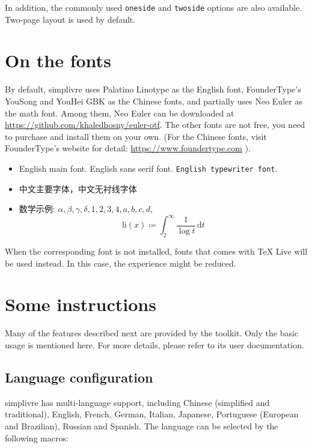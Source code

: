 \documentclass[puretext]{simplivre}
\newenvironment{tip}[1][Tip]{%
    \LocallyStopLineNumbers%
    \begin{tcolorbox}[breakable,
        enhanced,
        width = \textwidth,
        colback = paper, colbacktitle = paper,
        colframe = gray!50, boxrule=0.2mm,
        coltitle = black,
        fonttitle = \sffamily,
        attach boxed title to top left = {yshift=-\tcboxedtitleheight/2, xshift=.5cm},
        boxed title style = {boxrule=0pt, colframe=paper},
        before skip = 0.3cm,
        after skip = 0.3cm,
        top = 3mm,
        bottom = 3mm,
        title={\scshape\sffamily #1}]%
}{\end{tcolorbox}\ResumeLineNumbers}
\providecommand{\simplivre}{\textsf{simplivre}}
\begin{document}
\bigskip
In addition, the commonly used \texttt{oneside} and \texttt{twoside} options are also available. Two-page layout is used by default.

\chapter{On the fonts}
By default, \simplivre{} uses Palatino Linotype as the English font, FounderType's YouSong and YouHei GBK as the Chinese fonts, and partially uses Neo Euler as the math font. Among them, Neo Euler can be downloaded at \url{https://github.com/khaledhosny/euler-otf}. The other fonts are not free, you need to purchase and install them on your own. (For the Chinese fonts, visit FounderType's website for detail: \url{https://www.foundertype.com} ).

\begin{tip}[Font demonstration]
    \begin{itemize}
        \item English main font. \textsf{English sans serif font}. \texttt{English typewriter font}.
        \item 中文主要字体，\textsf{中文无衬线字体}
        \item 数学示例:  \( \alpha, \beta, \gamma, \delta, 1,2,3,4, a,b,c,d \), \[\mathrm{li}(x)\coloneqq \int_2^{\infty} \frac{1}{\log t}\,\mathrm{d}t \]
    \end{itemize}
\end{tip}

\bigskip
When the corresponding font is not installed, fonts that comes with TeX Live will be used instead. In this case, the experience might be reduced.


\chapter{Some instructions}

Many of the features described next are provided by the \ProjLib{} toolkit. Only the basic usage is mentioned here. For more details, please refer to its user documentation.

\section{Language configuration}

\simplivre{} has multi-language support, including Chinese (simplified and traditional), English, French, German, Italian, Japanese, Portuguese (European and Brazilian), Russian and Spanish. The language can be selected by the following macros:
\end{document}
